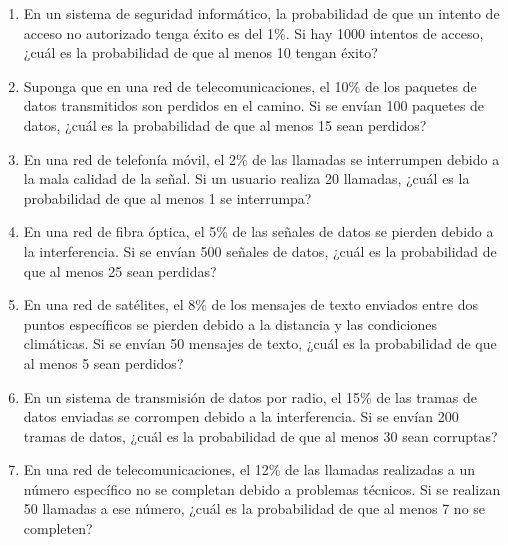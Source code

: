 \begin{Ejer}
\begin{enumerate}
    \item En un sistema de seguridad informático, la probabilidad de que un intento de acceso no autorizado tenga éxito es del 1\%. Si hay 1000 intentos de acceso, ¿cuál es la probabilidad de que al menos 10 tengan éxito?

    \item Suponga que en una red de telecomunicaciones, el 10\% de los paquetes de datos transmitidos son perdidos en el camino. Si se envían 100 paquetes de datos, ¿cuál es la probabilidad de que al menos 15 sean perdidos?

    \item En una red de telefonía móvil, el 2\% de las llamadas se interrumpen debido a la mala calidad de la se\~nal. Si un usuario realiza 20 llamadas, ¿cuál es la probabilidad de que al menos 1 se interrumpa?

    \item En una red de fibra \'optica, el 5\% de las se\~nales de datos se pierden debido a la interferencia. Si se envían 500 se\~nales de datos, ¿cuál es la probabilidad de que al menos 25 sean perdidas?

    \item En una red de sat\'elites, el 8\% de los mensajes de texto enviados entre dos puntos específicos se pierden debido a la distancia y las condiciones climáticas. Si se envían 50 mensajes de texto, ¿cuál es la probabilidad de que al menos 5 sean perdidos?

    \item En un sistema de transmisión de datos por radio, el 15\% de las tramas de datos enviadas se corrompen debido a la interferencia. Si se envían 200 tramas de datos, ¿cuál es la probabilidad de que al menos 30 sean corruptas?

    \item En una red de telecomunicaciones, el 12\% de las llamadas realizadas a un número específico no se completan debido a problemas técnicos. Si se realizan 50 llamadas a ese número, ¿cuál es la probabilidad de que al menos 7 no se completen?


\end{enumerate}
\end{Ejer} 


